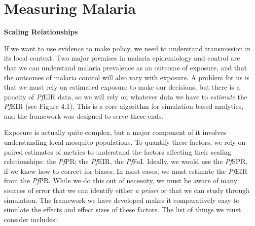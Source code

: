 \documentclass[
]{book}
\begin{document}
\hypertarget{measuring-malaria}{%
\chapter{Measuring Malaria}\label{measuring-malaria}}

\textbf{Scaling Relationships}

If we want to use evidence to make policy, we need to understand transmission in its local context. Two major premises in malaria epidemiology and control are that we can understand malaria prevalence as an outcome of exposure, and that the outcomes of malaria control will also vary with exposure. A problem for us is that we must rely on estimated exposure to make our decisions, but there is a paucity of \emph{Pf}EIR data, so we will rely on whatever data we have to \emph{estimate} the \emph{Pf}EIR (see Figure 4.1). This is a core algorithm for simulation-based analytics, and the framework was designed to serve these ends.

Exposure is actually quite complex, but a major component of it involves understanding local mosquito populations. To quantify these factors, we rely on paired estimates of metrics to understand the factors affecting their scaling relationships: the \emph{Pf}PR; the \emph{Pf}EIR, the \emph{Pf}FoI. Ideally, we would use the \emph{Pf}SPR, if we knew how to correct for biases. In most cases, we must estimate the \emph{Pf}EIR from the \emph{Pf}PR. While we do this out of necessity, we must be aware of many sources of error that we can identify either \emph{a priori} or that we can study through simulation. The framework we have developed makes it comparatively easy to simulate the effects and effect sizes of these factors. The list of things we must consider includes:
\end{document}
